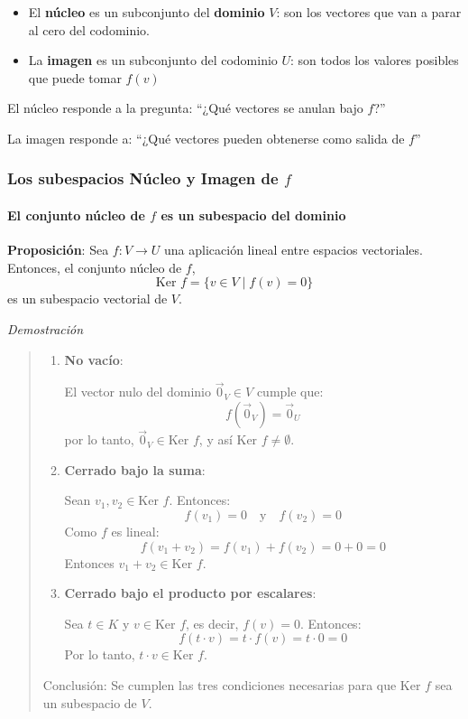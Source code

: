 \begin{tcolorbox}[title=Resumen para fijar la idea]
  \begin{itemize}
    \item El \textbf{núcleo} es un subconjunto del \textbf{dominio} \(V\): son los vectores que van a parar al cero del codominio.
    \item La \textbf{imagen} es un subconjunto del codominio \(U\): son todos los valores posibles que puede tomar \(f(v)\)
  \end{itemize}

  \vspace{5pt}

  El núcleo responde a la pregunta: ``¿Qué vectores se anulan bajo \(f\)?''

  La imagen responde a: ``¿Qué vectores pueden obtenerse como salida de \(f\)''
\end{tcolorbox}

\subsubsection{Los subespacios Núcleo y Imagen de \(f\)}

\paragraph{El conjunto núcleo de \(f\) es un subespacio del dominio}

\textbf{Proposición}: Sea \(f: V \to U\) una aplicación lineal entre espacios vectoriales. Entonces, el conjunto núcleo de \(f\),
\[
\text{Ker } f = \{ v \in V \mid f(v) = 0 \}
\]
es un subespacio vectorial de \(V\).

\textit{Demostración}
\begin{quote}
  \begin{enumerate}
    \item \textbf{No vacío}:
    
    El vector nulo del dominio \(\vec{0}_V \in V\) cumple que:
      \[
      f(\vec{0}_V) = \vec{0}_U
      \]
    por lo tanto, \(\vec{0}_V \in \text{Ker } f\), y así \(\text{Ker } f \ne \emptyset\).
  
    \item \textbf{Cerrado bajo la suma}:
    
      Sean \(v_1, v_2 \in \text{Ker } f\). Entonces:
     \[
     f(v_1) = 0 \quad \text{y} \quad f(v_2) = 0
     \]
     Como \(f\) es lineal:
     \[
     f(v_1 + v_2) = f(v_1) + f(v_2) = 0 + 0 = 0
     \]
     Entonces \(v_1 + v_2 \in \text{Ker } f\).
  
    \item \textbf{Cerrado bajo el producto por escalares}:
     
      Sea \(t \in K\) y \(v \in \text{Ker } f\), es decir, \(f(v) = 0\). Entonces:
     \[
     f(t \cdot v) = t \cdot f(v) = t \cdot 0 = 0
     \]
     Por lo tanto, \(t \cdot v \in \text{Ker } f\).
  \end{enumerate}
  
  Conclusión: Se cumplen las tres condiciones necesarias para que \(\text{Ker } f\) sea un subespacio de \(V\).
\end{quote}

